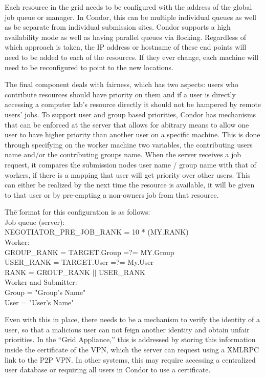 \documentclass[conference]{IEEEtran}
\begin{document}
Each resource in the grid needs to be configured with the address of the global
job queue or manager.  In Condor, this can be multiple individual queues as
well as be separate from individual submission sites.  Condor supports a high
availability mode as well as having parallel queues via flocking.  Regardless
of which approach is taken, the IP address or hostname of these end points will
need to be added to each of the resources.  If they ever change, each machine
will need to be reconfigured to point to the new locations.

The final component deals with fairness, which has two aspects:  users who
contribute resources should have priority on them and if a user is directly
accessing a computer lab's resource directly it should not be hampered by
remote users' jobs.  To support user and group based priorities, Condor has
mechanisms that can be enforced at the server that allows for abitrary means to
allow one user to have higher priority than another user on a specific machine.
This is done through specifying on the worker machine two variables, the
contributing users name and/or the contributing groups name.  When the server
receives a job request, it compares the submission nodes user name / group name
with that of workers, if there is a mapping that user will get priority over
other users.  This can either be realized by the next time the resource is
available, it will be given to that user or by pre-empting a non-owners job
from that resource.

\begin{tabbing}
Th\=e \=format for this configuration is as follows:\\
\> Job queue (server):\\
\> \> NEGOTIATOR\_PRE\_JOB\_RANK = 10 * (MY.RANK) \\
\> Worker:\\
\> \> GROUP\_RANK = TARGET.Group =?= MY.Group \\
\> \> USER\_RANK = TARGET.User =?= My.User \\
\> \> RANK = GROUP\_RANK $\vert\vert$ USER\_RANK \\
\>  Worker and Submitter:\\
\> \> Group = "Group's Name"\\
\> \> User = "User's Name"
\end{tabbing}

Even with this in place, there needs to be a mechanism to verify the identity
of a user, so that a malicious user can not feign another identity and obtain
unfair priorities.  In the ``Grid Appliance,'' this is addressed by storing
this information inside the certificate of the VPN, which the server can
request using a XMLRPC link to the P2P VPN.  In other systems, this may require
accessing a centralized user database or requiring all users in Condor to use a
certificate.
\end{document}
